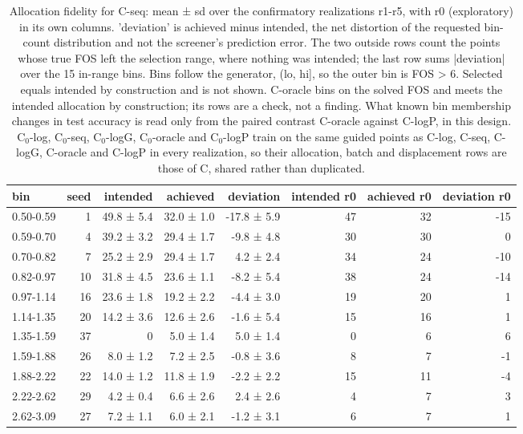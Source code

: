 \begin{table}[htbp]
\centering
\small
\setlength{\tabcolsep}{4pt}
\caption{Allocation fidelity for C-seq: mean ± sd over the confirmatory realizations r1-r5, with r0 (exploratory) in its own columns. 'deviation' is achieved minus intended, the net distortion of the requested bin-count distribution and not the screener's prediction error. The two outside rows count the points whose true FOS left the selection range, where nothing was intended; the last row sums |deviation| over the 15 in-range bins. Bins follow the generator, (lo, hi], so the outer bin is FOS > 6. Selected equals intended by construction and is not shown. C-oracle bins on the solved FOS and meets the intended allocation by construction; its rows are a check, not a finding. What known bin membership changes in test accuracy is read only from the paired contrast C-oracle against C-logP, in this design. C$_0$-log, C$_0$-seq, C$_0$-logG, C$_0$-oracle and C$_0$-logP train on the same guided points as C-log, C-seq, C-logG, C-oracle and C-logP in every realization, so their allocation, batch and displacement rows are those of C, shared rather than duplicated.}
\label{tab:structural:allocation:c-seq}
\begin{tabular}{lrrrrrrr}
\toprule
bin & seed & intended & achieved & deviation & intended r0 & achieved r0 & deviation r0 \\
\midrule
0.50-0.59 & 1 & 49.8 ± 5.4 & 32.0 ± 1.0 & -17.8 ± 5.9 & 47 & 32 & -15 \\
0.59-0.70 & 4 & 39.2 ± 3.2 & 29.4 ± 1.7 & -9.8 ± 4.8 & 30 & 30 & 0 \\
0.70-0.82 & 7 & 25.2 ± 2.9 & 29.4 ± 1.7 & 4.2 ± 2.4 & 34 & 24 & -10 \\
0.82-0.97 & 10 & 31.8 ± 4.5 & 23.6 ± 1.1 & -8.2 ± 5.4 & 38 & 24 & -14 \\
0.97-1.14 & 16 & 23.6 ± 1.8 & 19.2 ± 2.2 & -4.4 ± 3.0 & 19 & 20 & 1 \\
1.14-1.35 & 20 & 14.2 ± 3.6 & 12.6 ± 2.6 & -1.6 ± 5.4 & 15 & 16 & 1 \\
1.35-1.59 & 37 & 0 & 5.0 ± 1.4 & 5.0 ± 1.4 & 0 & 6 & 6 \\
1.59-1.88 & 26 & 8.0 ± 1.2 & 7.2 ± 2.5 & -0.8 ± 3.6 & 8 & 7 & -1 \\
1.88-2.22 & 22 & 14.0 ± 1.2 & 11.8 ± 1.9 & -2.2 ± 2.2 & 15 & 11 & -4 \\
2.22-2.62 & 29 & 4.2 ± 0.4 & 6.6 ± 2.6 & 2.4 ± 2.6 & 4 & 7 & 3 \\
2.62-3.09 & 27 & 7.2 ± 1.1 & 6.0 ± 2.1 & -1.2 ± 3.1 & 6 & 7 & 1 \\

\end{tabular}
\end{table}
